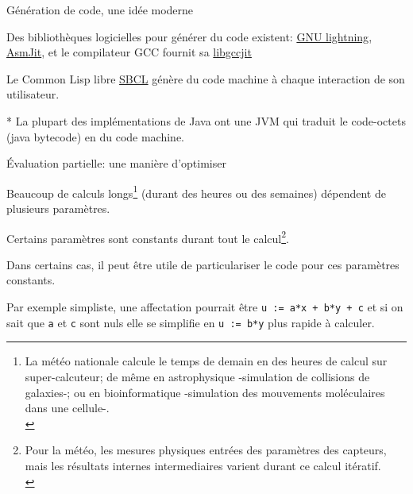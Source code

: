 \documentclass[final,a4]{beamer}
\begin{document}
 \begin{frame}{Génération de code, une idée moderne}

  Des bibliothèques logicielles pour générer du code existent:
  \href{https://www.gnu.org/software/lightning/}{GNU lightning},
  \href{https://asmjit.com/}{AsmJit}, et le compilateur GCC fournit sa
  \href{https://gcc.gnu.org/onlinedocs/jit/}{libgccjit}

  \bigskip
  
  Le Common Lisp libre \href{https://sbcl.org/}{SBCL} génère du code
  machine à chaque interaction de son utilisateur.

  \bigskip
  *
  La plupart des implémentations de Java ont une JVM qui traduit le code-octets (java bytecode) en du code machine.

 \end{frame}

 \begin{frame}{Évaluation partielle: une manière d'optimiser}

Beaucoup de calculs longs\footnote{La météo nationale calcule le temps
de demain en des heures de calcul sur super-calcuteur; de même en
astrophysique -simulation de collisions de galaxies-; ou en
bioinformatique -simulation des mouvements moléculaires dans une
cellule-.\\} (durant des heures ou des semaines) dépendent de plusieurs
paramètres.
\medskip

Certains paramètres sont constants durant tout le calcul\footnote{Pour
la météo, les mesures physiques entrées des paramètres des capteurs,
mais les résultats internes intermediaires varient durant ce calcul
itératif.\\}.
\medskip

Dans certains cas, il peut être utile de particulariser le code pour ces paramètres constants.

Par exemple simpliste, une affectation pourrait être \texttt{u := a*x
  + b*y + c} et si on sait que \texttt{a} et \texttt{c} sont nuls elle
se simplifie en \texttt{u := b*y} plus rapide à calculer.


 \end{frame}
\end{document}
